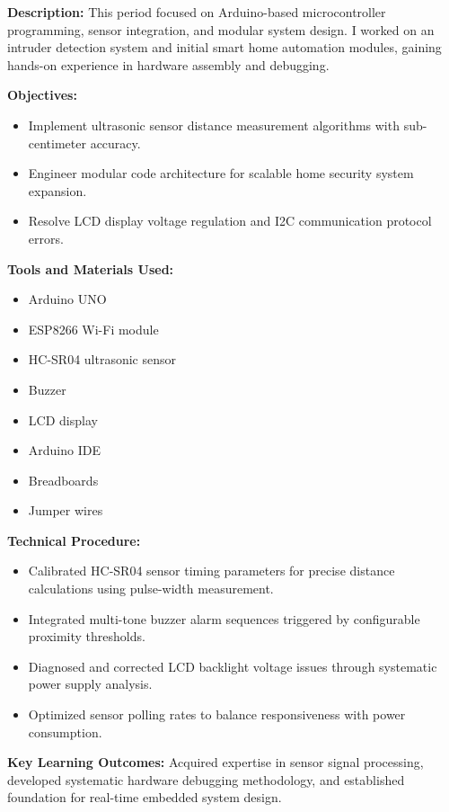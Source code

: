 \documentclass[12pt,a4paper]{report}
\begin{document}
\noindent\textbf{Description:} This period focused on Arduino-based microcontroller programming, sensor integration, and modular system design. I worked on an intruder detection system and initial smart home automation modules, gaining hands-on experience in hardware assembly and debugging.

\noindent\textbf{Objectives:}
\begin{itemize}
    \item Implement ultrasonic sensor distance measurement algorithms with sub-centimeter accuracy.
    \item Engineer modular code architecture for scalable home security system expansion.
    \item Resolve LCD display voltage regulation and I2C communication protocol errors.
\end{itemize}

\noindent\textbf{Tools and Materials Used:}
\begin{multicols}{2}
\begin{itemize}
    \item Arduino UNO
    \item ESP8266 Wi-Fi module
    \item HC-SR04 ultrasonic sensor
    \item Buzzer
    \item LCD display
    \item Arduino IDE
    \item Breadboards
    \item Jumper wires
\end{itemize}
\end{multicols}

\noindent\textbf{Technical Procedure:}
\begin{itemize}
    \item Calibrated HC-SR04 sensor timing parameters for precise distance calculations using pulse-width measurement.
    \item Integrated multi-tone buzzer alarm sequences triggered by configurable proximity thresholds.
    \item Diagnosed and corrected LCD backlight voltage issues through systematic power supply analysis.
    \item Optimized sensor polling rates to balance responsiveness with power consumption.
\end{itemize}

\noindent\textbf{Key Learning Outcomes:} Acquired expertise in sensor signal processing, developed systematic hardware debugging methodology, and established foundation for real-time embedded system design.
\end{document}
